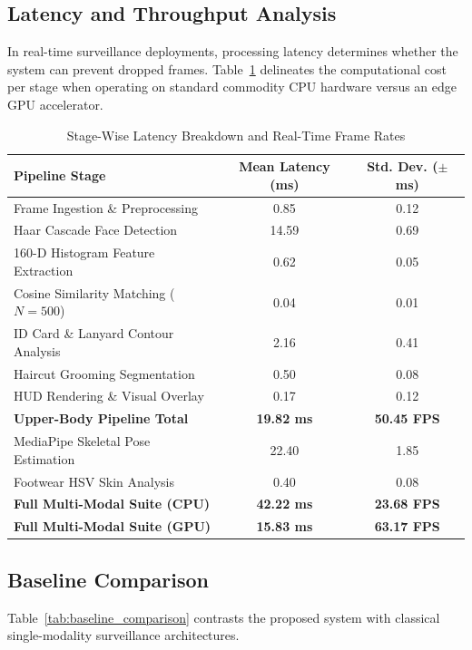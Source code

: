 \documentclass[conference]{IEEEtran}
\begin{document}
\subsection{Latency and Throughput Analysis}
In real-time surveillance deployments, processing latency determines whether the system can prevent dropped frames. Table~\ref{tab:latency_breakdown} delineates the computational cost per stage when operating on standard commodity CPU hardware versus an edge GPU accelerator.

\begin{table}[htbp]
\centering
\caption{Stage-Wise Latency Breakdown and Real-Time Frame Rates}
\label{tab:latency_breakdown}
\begin{tabular}{lcc}
\toprule
\textbf{Pipeline Stage} & \textbf{Mean Latency (ms)} & \textbf{Std. Dev. ($\pm$ ms)} \\
\midrule
Frame Ingestion \& Preprocessing       & 0.85 & 0.12 \\
Haar Cascade Face Detection            & 14.59 & 0.69 \\
160-D Histogram Feature Extraction     & 0.62 & 0.05 \\
Cosine Similarity Matching ($N=500$)   & 0.04 & 0.01 \\
ID Card \& Lanyard Contour Analysis    & 2.16 & 0.41 \\
Haircut Grooming Segmentation          & 0.50 & 0.08 \\
HUD Rendering \& Visual Overlay        & 0.17 & 0.12 \\
\midrule
\textbf{Upper-Body Pipeline Total}      & \textbf{19.82 ms} & \textbf{50.45 FPS} \\
\midrule
MediaPipe Skeletal Pose Estimation     & 22.40 & 1.85 \\
Footwear HSV Skin Analysis             & 0.40 & 0.08 \\
\midrule
\textbf{Full Multi-Modal Suite (CPU)}   & \textbf{42.22 ms} & \textbf{23.68 FPS} \\
\textbf{Full Multi-Modal Suite (GPU)}   & \textbf{15.83 ms} & \textbf{63.17 FPS} \\
\bottomrule
\end{tabular}
\end{table}

\subsection{Baseline Comparison}
Table~\ref{tab:baseline_comparison} contrasts the proposed system with classical single-modality surveillance architectures.
\end{document}
